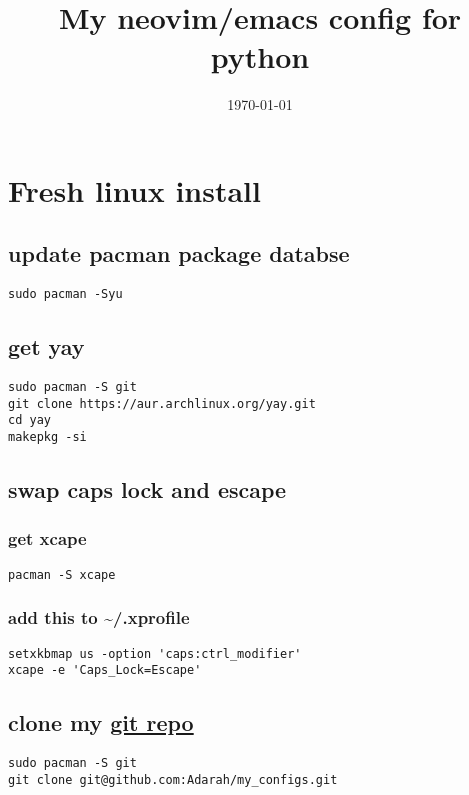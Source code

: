 \documentclass[11pt]{article}
\date{\today}
\title{My neovim/emacs config for python}
\begin{document}
\maketitle

\section{Fresh linux install}
\label{sec:orge5776d8}
\subsection{update pacman package databse}
\label{sec:org3bb78b6}
\begin{verbatim}
sudo pacman -Syu
\end{verbatim}
\subsection{get yay}
\label{sec:org6ec3e41}
\begin{verbatim}
sudo pacman -S git
git clone https://aur.archlinux.org/yay.git
cd yay
makepkg -si
\end{verbatim}
\subsection{swap caps lock and escape}
\label{sec:org4f4842e}
\subsubsection{get xcape}
\label{sec:org5ee61d2}
\begin{verbatim}
pacman -S xcape
\end{verbatim}
\subsubsection{add this to \textasciitilde{}/.xprofile}
\label{sec:org8fc1090}
\begin{verbatim}
setxkbmap us -option 'caps:ctrl_modifier'
xcape -e 'Caps_Lock=Escape'
\end{verbatim}
\subsection{clone my \href{https://github.com/https://github.com/Adarah/my\_configs}{git repo}}
\label{sec:org42a4ccc}
\begin{verbatim}
sudo pacman -S git
git clone git@github.com:Adarah/my_configs.git
\end{verbatim}
\end{document}
